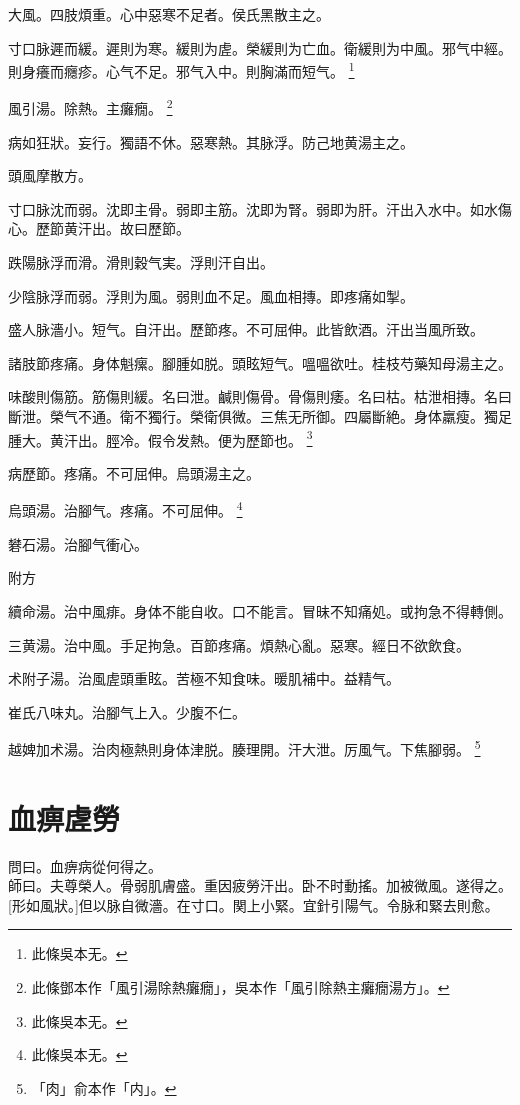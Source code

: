 \documentclass[12pt,twoside,UTF8,b5paper]{ctexbook}
\begin{document}
大風。四肢煩重。心中惡寒不足者。侯氏黑散主之。

寸口脉遲而緩。遲則为寒。緩則为虗。榮緩則为亡血。衛緩則为中風。邪气中經。則身癢而癮疹。心气不足。邪气入中。則胸滿而短气。
	\footnote{此條吳本无。}

風引湯。除熱。主癱癇。
	\footnote{此條鄧本作「風引湯除熱癱癇」，吳本作「風引除熱主癱癇湯方」。}

病如狂狀。妄行。獨語不休。惡寒熱。其脉浮。防己地黄湯主之。

頭風摩散方。

寸口脉沈而弱。沈即主骨。弱即主筋。沈即为腎。弱即为肝。汗出入水中。如水傷心。歷節黄汗出。故曰歷節。

跌陽脉浮而滑。滑則穀气実。浮則汗自出。

少陰脉浮而弱。浮則为風。弱則血不足。風血相摶。即疼痛如掣。

盛人脉濇小。短气。自汗出。歷節疼。不可屈伸。此皆飲酒。汗出当風所致。

諸肢節疼痛。身体魁瘰。腳腫如脱。頭眩短气。嗢嗢欲吐。桂枝芍藥知母湯主之。

味酸則傷筋。筋傷則緩。名曰泄。鹹則傷骨。骨傷則痿。名曰枯。枯泄相摶。名曰斷泄。榮气不通。衛不獨行。榮衛俱微。三焦无所御。四屬斷絶。身体羸瘦。獨足腫大。黄汗出。脛冷。假令发熱。便为歷節也。
	\footnote{此條吳本无。}

病歷節。疼痛。不可屈伸。烏頭湯主之。

烏頭湯。治腳气。疼痛。不可屈伸。
	\footnote{此條吳本无。}

礬石湯。治腳气衝心。

附方

續命湯。治中風痱。身体不能自收。口不能言。冒昧不知痛処。或拘急不得轉側。

三黄湯。治中風。手足拘急。百節疼痛。煩熱心亂。惡寒。經日不欲飲食。

术附子湯。治風虗頭重眩。苦極不知食味。暖肌補中。益精气。

崔氏八味丸。治腳气上入。少腹不仁。

越婢加术湯。治肉極熱則身体津脱。腠理開。汗大泄。厉風气。下焦腳弱。
	\footnote{「肉」俞本作「内」。}

\chapter{血痹虗勞}

問曰。血痹病從何得之。\\
師曰。夫尊榮人。骨弱肌膚盛。重因疲勞汗出。卧不时動搖。加被微風。遂得之。[形如風狀。]但以脉自微濇。在寸口。関上小緊。宜針引陽气。令脉和緊去則愈。
\end{document}
